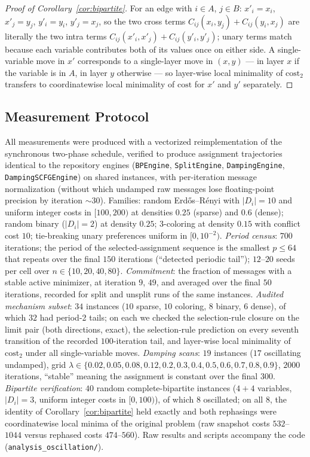 \documentclass[letterpaper]{article} %
\theoremstyle{definition}
\theoremstyle{remark}
\begin{document}
\begin{proof}[Proof of Corollary~\ref{cor:bipartite}]
For an edge with $i \in A$, $j \in B$: $x'_i = x_i$, $x'_j = y_j$,
$y'_i = y_i$, $y'_j = x_j$, so the two cross terms
$C_{ij}(x_i, y_j) + C_{ij}(y_i, x_j)$ are literally the two intra terms
$C_{ij}(x'_i, x'_j) + C_{ij}(y'_i, y'_j)$; unary terms match because
each variable contributes both of its values once on either side.  A
single-variable move in $x'$ corresponds to a single-layer move in
$(x,y)$ --- in layer $x$ if the variable is in $A$, in layer $y$
otherwise --- so layer-wise local minimality of $\mathrm{cost}_2$
transfers to coordinatewise local minimality of $\mathrm{cost}$ for $x'$
and $y'$ separately.
\end{proof}

\subsection{Measurement Protocol}

All measurements were produced with a vectorized reimplementation of the
synchronous two-phase schedule, verified to produce assignment
trajectories identical to the repository engines
(\texttt{BPEngine}, \texttt{SplitEngine}, \texttt{DampingEngine},
\texttt{DampingSCFGEngine}) on shared instances, with per-iteration
message normalization (without which undamped raw messages lose
floating-point precision by iteration ${\sim}30$).  Families: random
Erd\H{o}s--R\'enyi with $|D_i| = 10$ and uniform integer costs in
$[100, 200)$ at densities $0.25$ (sparse) and $0.6$ (dense); random
binary ($|D_i| = 2$) at density $0.25$; 3-coloring at density $0.15$
with conflict cost $10$; tie-breaking unary preferences uniform in
$[0, 10^{-2})$.  \emph{Period census}: $700$ iterations; the period of
the selected-assignment sequence is the smallest $p \le 64$ that repeats
over the final $150$ iterations (``detected periodic tail''); $12$--$20$
seeds per cell over $n \in \{10, 20, 40, 80\}$.  \emph{Commitment}: the
fraction of messages with a stable active minimizer, at iteration $9$,
$49$, and averaged over the final $50$ iterations, recorded for split
and unsplit runs of the same instances.  \emph{Audited mechanism
subset}: $34$ instances ($10$ sparse, $10$ coloring, $8$ binary, $6$
dense), of which $32$ had period-2 tails; on each we checked the
selection-rule closure on the limit pair (both directions, exact), the
selection-rule prediction on every seventh transition of the recorded
$100$-iteration tail, and layer-wise local minimality of
$\mathrm{cost}_2$ under all single-variable moves.  \emph{Damping scans}:
$19$ instances ($17$ oscillating undamped), grid
$\lambda \in \{0.02, 0.05, 0.08, 0.12, 0.2, 0.3, 0.4, 0.5, 0.6, 0.7,
0.8, 0.9\}$, $2000$ iterations, ``stable'' meaning the assignment is
constant over the final $300$.  \emph{Bipartite verification}: $40$
random complete-bipartite instances ($4{+}4$ variables, $|D_i| = 3$,
uniform integer costs in $[0,100)$), of which $8$ oscillated; on all
$8$, the identity of Corollary~\ref{cor:bipartite} held exactly and both
rephasings were coordinatewise local minima of the original problem
(raw snapshot costs $532$--$1044$ versus rephased costs $474$--$560$).
Raw results and scripts accompany the code
(\texttt{analysis\_oscillation/}).
\end{document}
